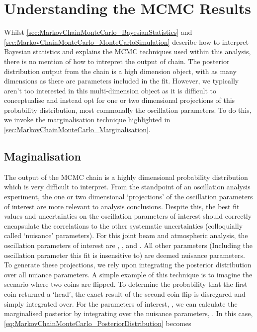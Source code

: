 \section{Understanding the MCMC Results}
\label{sec:MarkovChainMonteCarlo_UnderstandingMCMCResults}

Whilst \autoref{sec:MarkovChainMonteCarlo_BayesianStatistics} and \autoref{sec:MarkovChainMonteCarlo_MonteCarloSimulation} describe how to interpret Bayesian statistics and explains the MCMC techniques used within this analysis, there is no mention of how to intrepret the output of chain. The posterior distribution output from the chain is a high dimension object, with as many dimensions as there are parameters included in the fit. However, we typically aren't too interested in this multi-dimension object as it is difficult to conceptualise and instead opt for one or two dimensional projections of this probability distribution, most commonally the oscillation parameters. To do this, we invoke the marginalisation technique highlighted in \autoref{sec:MarkovChainMonteCarlo_Marginalisation}.

\subsection{Maginalisation}
\label{sec:MarkovChainMonteCarlo_Marginalisation}

The output of the MCMC chain is a highly dimensional probability distribution which is very difficult to interpret. From the standpoint of an oscillation analysis experiment, the one or two dimensional `projections' of the oscillation parameters of interest are more relevant to analysis conclusions. Despite this, the best fit values and uncertainties on the oscillation parameters of interest should correctly encapsulate the correlations to the other systematic uncertainties (colloquially called `nuisance' parameters). For this joint beam and atmospheric analysis, the oscillation parameters of interest are \sinsqatm, \sinsqreac, \delmsqatm and \dcp. All other parameters (Including the oscillation parameter this fit is insensitive to) are deemed nuisance parameters. To generate these projections, we rely upon integrating the posterior distribution over all nuiance parameters. A simple example of this technique is to imagine the scenario where two coins are flipped. To determine the probability that the first coin returned a `head', the exact result of the second coin flip is disregared and simply integrated over. For the parameters of interest, , we can calculate the marginalised posterior by integrating over the nuisance parameters, . In this case, \autoref{eq:MarkovChainMonteCarlo_PosteriorDistribution} becomes

